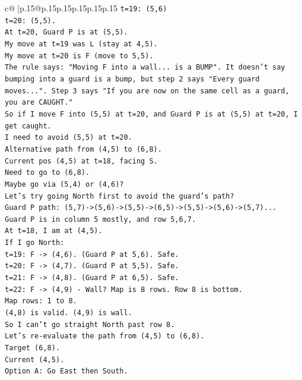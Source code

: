 \documentclass{article}
\begin{document}
{\begin{supertabular}{c@{$\;$}|p{.15\linewidth}@{}p{.15\linewidth}p{.15\linewidth}p{.15\linewidth}p{.15\linewidth}p{.15\linewidth}}
{{{\texttt{t=19: (5,6)} \\
\texttt{t=20: (5,5).} \\
\texttt{At t=20, Guard P is at (5,5).} \\
\texttt{My move at t=19 was L (stay at 4,5).} \\
\texttt{My move at t=20 is F (move to 5,5).} \\
\texttt{The rule says: "Moving F into a wall... is a BUMP". It doesn't say bumping into a guard is a bump, but step 2 says "Every guard moves...". Step 3 says "If you are now on the same cell as a guard, you are CAUGHT."} \\
\texttt{So if I move F into (5,5) at t=20, and Guard P is at (5,5) at t=20, I get caught.} \\
\texttt{I need to avoid (5,5) at t=20.} \\
\texttt{Alternative path from (4,5) to (6,8).} \\
\texttt{Current pos (4,5) at t=18, facing S.} \\
\texttt{Need to go to (6,8).} \\
\texttt{Maybe go via (5,4) or (4,6)?} \\
\texttt{Let's try going North first to avoid the guard's path?} \\
\texttt{Guard P path: (5,7){-}>(5,6){-}>(5,5){-}>(6,5){-}>(5,5){-}>(5,6){-}>(5,7)...} \\
\texttt{Guard P is in column 5 mostly, and row 5,6,7.} \\
\texttt{At t=18, I am at (4,5).} \\
\texttt{If I go North:} \\
\texttt{t=19: F {-}> (4,6). (Guard P at 5,6). Safe.} \\
\texttt{t=20: F {-}> (4,7). (Guard P at 5,5). Safe.} \\
\texttt{t=21: F {-}> (4,8). (Guard P at 6,5). Safe.} \\
\texttt{t=22: F {-}> (4,9) {-} Wall? Map is 8 rows. Row 8 is bottom.} \\
\texttt{Map rows: 1 to 8.} \\
\texttt{(4,8) is valid. (4,9) is wall.} \\
\texttt{So I can't go straight North past row 8.} \\
\texttt{Let's re{-}evaluate the path from (4,5) to (6,8).} \\
\texttt{Target (6,8).} \\
\texttt{Current (4,5).} \\
\texttt{Option A: Go East then South.} \\
}}}
\end{supertabular}}
\end{document}
